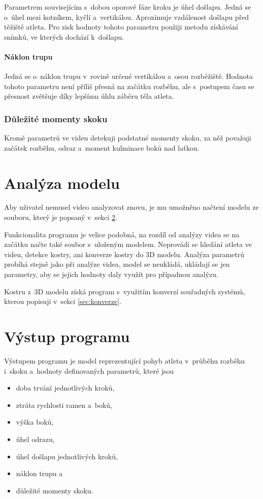 Parametrem souvisejícím s~dobou oporové fáze kroku je úhel došlapu. Jedná se o~úhel mezi kotníkem, kyčlí a~vertikálou. Aproximuje vzdálenost došlapu před těžiště atleta. Pro zisk hodnoty tohoto parametru použiji metodu získávání snímků, ve kterých dochází k~došlapu.

\paragraph{Náklon trupu}

Jedná se o~náklon trupu v~rovině určené vertikálou a~osou rozběžiště. Hodnota tohoto parametru není příliš přesná na začátku rozběhu, ale s~postupem času se přesnost zvětšuje díky lepšímu úhlu záběru těla atleta.


\subsubsection{Důležité momenty skoku}

Kromě parametrů ve videu detekuji podstatné momenty skoku, za něž považuji začátek rozběhu, odraz a~moment kulminace boků nad laťkou.




\section{Analýza modelu}

Aby uživatel nemusel video analyzovat znovu, je mu umožněno načtení modelu ze souboru, který je popsaný v~sekci \ref{sec:vystup}.

Funkcionalita programu je velice podobná, na rozdíl od analýzy videa se na začátku načte také soubor s~uloženým modelem. Neprovádí se hledání atleta ve videu, detekce kostry, ani konverze kostry do 3D modelu. Analýza parametrů probíhá stejně jako při analýze videa, model se neukládá, ukládají se jen parametry, aby se jejich hodnoty daly využít pro případnou analýzu.

Kostru z~3D modelu získá program s~využitím konverzí souřadných systémů, kterou popisuji v~sekci \ref{sec:konverze}.




\section{Výstup programu}
\label{sec:vystup}

Výstupem programu je model reprezentující pohyb atleta v~průběhu rozběhu i~skoku a~hodnoty definovaných parametrů, které jsou
\begin{itemize}
    \item doba trvání jednotlivých kroků,
    \item ztráta rychlosti ramen a~boků,
    \item výška boků,
    \item úhel odrazu,
    \item úhel došlapu jednotlivých kroků,
    \item náklon trupu a
    \item důležité momenty skoku.
\end{itemize}


